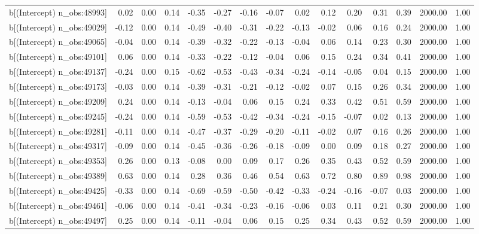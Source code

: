 \begin{table}[ht]
\begin{tabular}{rrrrrrrrrrrrrrr}
  b[(Intercept) n\_obs:48993] & 0.02 & 0.00 & 0.14 & -0.35 & -0.27 & -0.16 & -0.07 & 0.02 & 0.12 & 0.20 & 0.31 & 0.39 & 2000.00 & 1.00 \\ 
  b[(Intercept) n\_obs:49029] & -0.12 & 0.00 & 0.14 & -0.49 & -0.40 & -0.31 & -0.22 & -0.13 & -0.02 & 0.06 & 0.16 & 0.24 & 2000.00 & 1.00 \\ 
  b[(Intercept) n\_obs:49065] & -0.04 & 0.00 & 0.14 & -0.39 & -0.32 & -0.22 & -0.13 & -0.04 & 0.06 & 0.14 & 0.23 & 0.30 & 2000.00 & 1.00 \\ 
  b[(Intercept) n\_obs:49101] & 0.06 & 0.00 & 0.14 & -0.33 & -0.22 & -0.12 & -0.04 & 0.06 & 0.15 & 0.24 & 0.34 & 0.41 & 2000.00 & 1.00 \\ 
  b[(Intercept) n\_obs:49137] & -0.24 & 0.00 & 0.15 & -0.62 & -0.53 & -0.43 & -0.34 & -0.24 & -0.14 & -0.05 & 0.04 & 0.15 & 2000.00 & 1.00 \\ 
  b[(Intercept) n\_obs:49173] & -0.03 & 0.00 & 0.14 & -0.39 & -0.31 & -0.21 & -0.12 & -0.02 & 0.07 & 0.15 & 0.26 & 0.34 & 2000.00 & 1.00 \\ 
  b[(Intercept) n\_obs:49209] & 0.24 & 0.00 & 0.14 & -0.13 & -0.04 & 0.06 & 0.15 & 0.24 & 0.33 & 0.42 & 0.51 & 0.59 & 2000.00 & 1.00 \\ 
  b[(Intercept) n\_obs:49245] & -0.24 & 0.00 & 0.14 & -0.59 & -0.53 & -0.42 & -0.34 & -0.24 & -0.15 & -0.07 & 0.02 & 0.13 & 2000.00 & 1.00 \\ 
  b[(Intercept) n\_obs:49281] & -0.11 & 0.00 & 0.14 & -0.47 & -0.37 & -0.29 & -0.20 & -0.11 & -0.02 & 0.07 & 0.16 & 0.26 & 2000.00 & 1.00 \\ 
  b[(Intercept) n\_obs:49317] & -0.09 & 0.00 & 0.14 & -0.45 & -0.36 & -0.26 & -0.18 & -0.09 & 0.00 & 0.09 & 0.18 & 0.27 & 2000.00 & 1.00 \\ 
  b[(Intercept) n\_obs:49353] & 0.26 & 0.00 & 0.13 & -0.08 & 0.00 & 0.09 & 0.17 & 0.26 & 0.35 & 0.43 & 0.52 & 0.59 & 2000.00 & 1.00 \\ 
  b[(Intercept) n\_obs:49389] & 0.63 & 0.00 & 0.14 & 0.28 & 0.36 & 0.46 & 0.54 & 0.63 & 0.72 & 0.80 & 0.89 & 0.98 & 2000.00 & 1.00 \\ 
  b[(Intercept) n\_obs:49425] & -0.33 & 0.00 & 0.14 & -0.69 & -0.59 & -0.50 & -0.42 & -0.33 & -0.24 & -0.16 & -0.07 & 0.03 & 2000.00 & 1.00 \\ 
  b[(Intercept) n\_obs:49461] & -0.06 & 0.00 & 0.14 & -0.41 & -0.34 & -0.23 & -0.16 & -0.06 & 0.03 & 0.11 & 0.21 & 0.30 & 2000.00 & 1.00 \\ 
  b[(Intercept) n\_obs:49497] & 0.25 & 0.00 & 0.14 & -0.11 & -0.04 & 0.06 & 0.15 & 0.25 & 0.34 & 0.43 & 0.52 & 0.59 & 2000.00 & 1.00 \\ 

\end{tabular}
\end{table}
